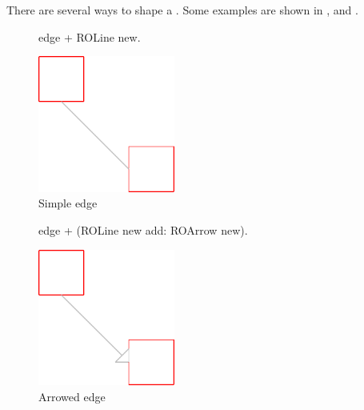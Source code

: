 \documentclass[a4paper,10pt,twoside]{book}
\begin{document}
There are several ways to shape a . Some examples are shown in ,  and .

\begin{figure}[H]
      \begin{minipage}[t]{0.5\textwidth}
      \vspace{0pt}
     \begin{code}{}
edge + ROLine new. \end{code}
   \end{minipage}
   \hfill
   \begin{minipage}[t]{0.4\textwidth}
      \vspace{0pt} \raggedright
       \centering
		\includegraphics[width=0.4\textwidth]{line}
   \end{minipage}
\caption{Simple edge}
\label{fig:line}
\end{figure} 

\begin{figure}[H]
      \begin{minipage}[t]{0.5\textwidth}
      \vspace{0pt}
     \begin{code}{}
edge + (ROLine new add: ROArrow new). \end{code}
   \end{minipage}
   \hfill
   \begin{minipage}[t]{0.4\textwidth}
      \vspace{0pt} \raggedright
       \centering
		\includegraphics[width=0.4\textwidth]{arrowEdge}
   \end{minipage}
\caption{Arrowed edge}
\label{fig:arrowEdge}
\end{figure} 
\end{document}
